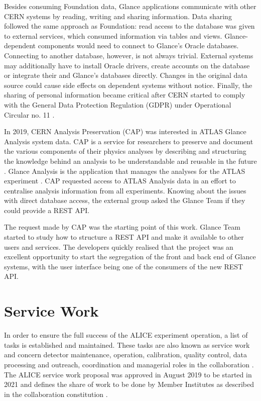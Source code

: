 Besides consuming Foundation data, Glance applications communicate with other CERN systems by reading, writing and sharing information. Data sharing followed the same approach as Foundation: read access to the database was given to external services, which consumed information via tables and views. Glance-dependent components would need to connect to Glance's Oracle databases. Connecting to another database, however, is not always trivial. External systems may additionally have to install Oracle drivers, create accounts on the database or integrate their and Glance's databases directly. Changes in the original data source could cause side effects on dependent systems without notice. Finally, the sharing of personal information became critical after CERN started to comply with the General Data Protection Regulation (GDPR) \cite{gdpr} under Operational Circular no. 11 \cite{cern-operational-circular-11}.

In 2019, CERN Analysis Preservation (CAP) was interested in ATLAS Glance Analysis system data. CAP is a service for researchers to preserve and document the various components of their physics analyses by describing and structuring the knowledge behind an analysis to be understandable and reusable in the future \cite{cap-website}. Glance Analysis is the application that manages the analyses for the ATLAS experiment \cite{atlas-glance-analysis} \cite{gabriela-lemos-tcc}. CAP requested access to ATLAS Analysis data in an effort to centralise analysis information from all experiments. Knowing about the issues with direct database access, the external group asked the Glance Team if they could provide a REST API.

The request made by CAP was the starting point of this work. Glance Team started to study how to structure a REST API and make it available to other users and services. The developers quickly realised that the project was an excellent opportunity to start the segregation of the front and back end of Glance systems, with the user interface being one of the consumers of the new REST API.

\section{Service Work}

In order to ensure the full success of the ALICE experiment operation, a list of tasks is established and maintained. These tasks are also known as service work and concern detector maintenance, operation, calibration, quality control, data processing and outreach, coordination and managerial roles in the collaboration \cite{alice-collaboration-service-work}. The ALICE service work proposal was approved in August 2019 to be started in 2021 \cite{service-work-modus-operandi} and defines the share of work to be done by Member Institutes as described in the collaboration constitution \cite{alice-constitution}.

